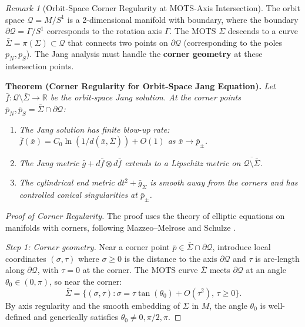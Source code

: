 \documentclass[12pt]{article}
\theoremstyle{plain}
\theoremstyle{definition}
\theoremstyle{remark}
\newtheorem{remark}[theorem]{Remark}
\begin{document}
\begin{remark}[Orbit-Space Corner Regularity at MOTS-Axis Intersection]\label{rem:corner-regularity}
The orbit space $\mathcal{Q} = M/S^1$ is a 2-dimensional manifold with boundary, where the boundary $\partial\mathcal{Q} = \Gamma/S^1$ corresponds to the rotation axis $\Gamma$. The MOTS $\Sigma$ descends to a curve $\bar{\Sigma} = \pi(\Sigma) \subset \mathcal{Q}$ that connects two points on $\partial\mathcal{Q}$ (corresponding to the poles $p_N, p_S$). The Jang analysis must handle the \textbf{corner geometry} at these intersection points.

\textbf{Theorem (Corner Regularity for Orbit-Space Jang Equation).}
\textit{Let $\bar{f}: \mathcal{Q} \setminus \bar{\Sigma} \to \mathbb{R}$ be the orbit-space Jang solution. At the corner points $\bar{p}_N, \bar{p}_S = \bar{\Sigma} \cap \partial\mathcal{Q}$:}
\begin{enumerate}[label=\textup{(\roman*)}]
    \item \textit{The Jang solution has finite blow-up rate: $\bar{f}(\bar{x}) = C_0 \ln(1/d(\bar{x}, \bar{\Sigma})) + O(1)$ as $\bar{x} \to \bar{p}_\pm$.}
    \item \textit{The Jang metric $\bar{g} + d\bar{f} \otimes d\bar{f}$ extends to a Lipschitz metric on $\overline{\mathcal{Q} \setminus \bar{\Sigma}}$.}
    \item \textit{The cylindrical end metric $dt^2 + \bar{g}_{\bar{\Sigma}}$ is smooth away from the corners and has controlled conical singularities at $\bar{p}_\pm$.}
\end{enumerate}

\begin{proof}[Proof of Corner Regularity]
The proof uses the theory of elliptic equations on manifolds with corners, following Mazzeo--Melrose \cite{mazzeo1987} and Schulze \cite{schulze1998}.

\textit{Step 1: Corner geometry.}
Near a corner point $\bar{p} \in \bar{\Sigma} \cap \partial\mathcal{Q}$, introduce local coordinates $(\sigma, \tau)$ where $\sigma \geq 0$ is the distance to the axis $\partial\mathcal{Q}$ and $\tau$ is arc-length along $\partial\mathcal{Q}$, with $\tau = 0$ at the corner. The MOTS curve $\bar{\Sigma}$ meets $\partial\mathcal{Q}$ at an angle $\theta_0 \in (0, \pi)$, so near the corner:
\[
\bar{\Sigma} = \{(\sigma, \tau) : \sigma = \tau \tan(\theta_0) + O(\tau^2), \, \tau \geq 0\}.
\]
By axis regularity and the smooth embedding of $\Sigma$ in $M$, the angle $\theta_0$ is well-defined and generically satisfies $\theta_0 \neq 0, \pi/2, \pi$.


\end{proof}
\end{remark}
\end{document}

